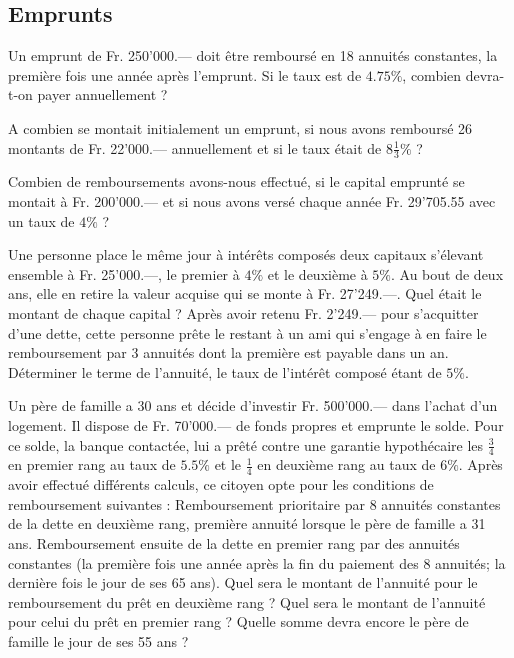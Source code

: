 \subsection{Emprunts}

\begin{exercice}
Un emprunt de Fr. 250'000.— doit être remboursé en 18 annuités constantes, la première fois une année après l’emprunt. Si le taux est de $4.75 \%$, combien devra-t-on payer annuellement ?
\end{exercice}

\begin{exercice}
A combien se montait initialement un emprunt, si nous avons remboursé 26 montants de Fr. 22'000.— annuellement et si le taux était de $8\frac{1}{3} \%$ ?
\end{exercice}

\begin{exercice}
Combien de remboursements avons-nous effectué, si le capital emprunté se montait à Fr. 200'000.— et si nous avons versé chaque année Fr. 29'705.55 avec un taux de $4 \%$ ?
\end{exercice}

\begin{exercice}
Une personne place le même jour à intérêts composés deux capitaux s’élevant ensemble à Fr. 25'000.—, le premier à $4 \%$ et le deuxième à $5 \%$. Au bout de deux ans, elle en retire la valeur acquise qui se monte à Fr. 27'249.—. Quel était le montant de chaque capital ?
Après avoir retenu Fr. 2'249.— pour s’acquitter d’une dette, cette personne prête le restant à un ami qui s’engage à en faire le remboursement par 3 annuités dont la première est payable dans un an.
Déterminer le terme de l’annuité, le taux de l’intérêt composé étant de $5 \%$. 
\end{exercice}

\begin{exercice}
Un père de famille a 30 ans et décide d’investir Fr. 500'000.— dans l’achat d’un logement. Il dispose de Fr. 70'000.— de fonds propres et emprunte le solde. Pour ce solde, la banque contactée, lui a prêté contre une garantie hypothécaire les $\frac{3}{4}$ en premier rang au taux de $5.5 \%$ et le $\frac{1}{4}$ en deuxième rang au taux de $6 \%$.
Après avoir effectué différents calculs, ce citoyen opte pour les conditions de remboursement suivantes :
Remboursement prioritaire par 8 annuités constantes de la dette en deuxième rang, première annuité lorsque le père de famille a 31 ans.
Remboursement ensuite de la dette en premier rang par des annuités constantes (la première fois une année après la fin du paiement des 8 annuités; la dernière fois le jour de ses 65 ans).
Quel sera le montant de l’annuité pour le remboursement du prêt en deuxième rang ?
Quel sera le montant de l’annuité pour celui du prêt en premier rang ?
Quelle somme devra encore le père de famille le jour de ses 55 ans ?
\end{exercice}

